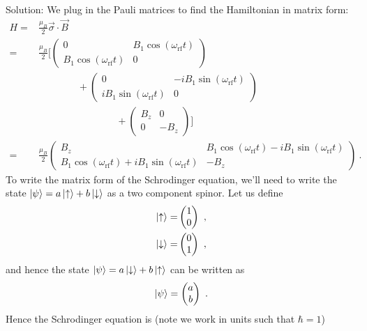 \documentclass{../lab}
\begin{document}
\begin{enumerate}
\begin{enumerate}
Solution: We plug in the Pauli matrices to find the Hamiltonian in matrix form:
\begin{align*}
	H = & \frac{\mu_B}{2} \vec{\sigma} \cdot \vec{B} \\
	= & \frac{\mu_B}{2} \bigg[ 
	\begin{pmatrix}
		0 & B_1 \cos(\omega_\text{rf} t) \\
		 B_1 \cos(\omega_\text{rf} t) & 0
	\end{pmatrix} 
	\\
	&~~~~~~~~~~~~~~~~~~ +
	\begin{pmatrix}
		0 & - i B_1 \sin(\omega_\text{rf} t) \\
		i B_1 \sin(\omega_\text{rf} t) & 0
	\end{pmatrix}
	\\
	&~~~~~~~~~~~~~~~~~~~~~~~~~~~~~~~~~~~~ +
	\begin{pmatrix}
		B_z & 0 \\
		0 & - B_z
	\end{pmatrix}
	\bigg]
	\\
	= & 
	\frac{\mu_B}{2}
	\begin{pmatrix}
		B_z & B_1 \cos(\omega_\text{rf} t) - i B_1 \sin(\omega_\text{rf} t) \\
		 B_1 \cos(\omega_\text{rf} t) + i B_1 \sin(\omega_\text{rf} t)& -B_z
	\end{pmatrix} 
	~.
\end{align*}
To write the matrix form of the Schrodinger equation, we'll need to write the state $\ket{\psi} = a \ket{\uparrow} + b\ket{\downarrow}$ as a two component spinor. Let us define
\begin{align*}
	\ket{\uparrow} =& 
	\begin{pmatrix}
		1	\\
		0
	\end{pmatrix}
	~, \\
	\ket{\downarrow} =& 
	\begin{pmatrix}
		0	\\
		1
	\end{pmatrix}
	~,
\end{align*}
and hence the state $\ket{\psi} = a \ket{\downarrow} + b\ket{\uparrow}$ can be written as 
\begin{align*}
	\ket{\psi} = 
	\begin{pmatrix}
		a \\
		b
	\end{pmatrix}~.
\end{align*}
Hence the Schrodinger equation is (note we work in units such that $\hbar = 1$)

\end{enumerate}
\end{enumerate}
\end{document}
